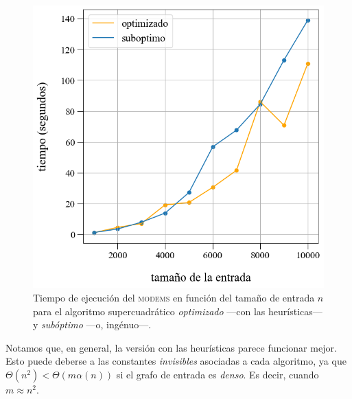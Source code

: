 \vspace{0.5em}
\begin{figure}[!htbp]
    \includegraphics[scale=0.4, clip]{./files/src/.media/comparacion_DSU.png}
    \caption{Tiempo de ejecución del \textsc{modems} en función del tamaño de entrada $n$ para el algoritmo supercuadrático \textit{optimizado} ---con las heurísticas--- y \textit{subóptimo} ---o, ingénuo---.}\label{fig2}
\end{figure}

Notamos que, en general, la versión con las heurísticas parece funcionar mejor. Esto puede deberse a las constantes \textit{invisibles} asociadas a cada algoritmo, ya que $\Theta(n^2) < \Theta(m\alpha(n))$ si el grafo de entrada es \textit{denso}. Es decir, cuando $m \approx n^2$. 
